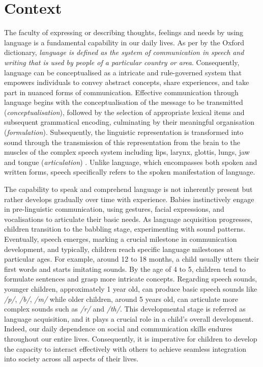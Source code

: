 \cleardoublepage
\label{chapter:1}

\section{Context}
The faculty of expressing or describing thoughts, feelings and needs by using language is a fundamental capability in our daily lives. As per by the Oxford dictionary,  \textit{language is defined as the system of communication in speech and writing that is used by people of a particular country or area}. Consequently, language can be conceptualised as a intricate and rule-governed system that empowers individuals to convey abstract concepts, share experiences, and take part in nuanced forms of communication. Effective communication through language begins with the conceptualisation of the message to be transmitted (\textit{conceptualisation}), followed by the selection of appropriate lexical items and subsequent grammatical encoding, culminating by their meaningful organisation (\textit{formulation}). Subsequently, the linguistic representation is transformed into sound through the transmission of this representation from the brain to the muscles of the complex speech system including lips, larynx, glottis, lungs, jaw and tongue (\textit{articulation}) \cite{levelt1993speaking}. Unlike language, which encompasses both spoken and written forms, speech specifically refers to the spoken manifestation of language.


The capability to speak and comprehend language is not inherently present but rather develops gradually over time with experience. Babies  instinctively engage in pre-linguistic communication, using gestures, facial expressions, and vocalisations to articulate their basic needs. As language acquisition progresses, children transition to the babbling stage, experimenting with sound patterns. Eventually, speech emerges, marking a crucial milestone in communication development, and typically, children reach specific language milestones at particular ages. For example, around 12 to 18 months, a child usually utters their first words and starts imitating sounds. By the age of 4 to 5, children tend to formulate sentences and grasp more intricate concepts. Regarding speech sounds, younger children, approximately 1 year old, can produce basic speech sounds like \textit{/p/}, \textit{/b/}, \textit{/m/} while older children, around 5 years old, can articulate more complex sounds such as \textit{/r/} and \textit{/th/}. This developmental stage is referred as language acquisition, and it plays a crucial role in a child's overall development. Indeed, our daily dependence on social and communication skills endures throughout our entire lives. Consequently, it is imperative for children to develop the capacity to interact effectively with others to achieve seamless integration into society across all aspects of their lives.

